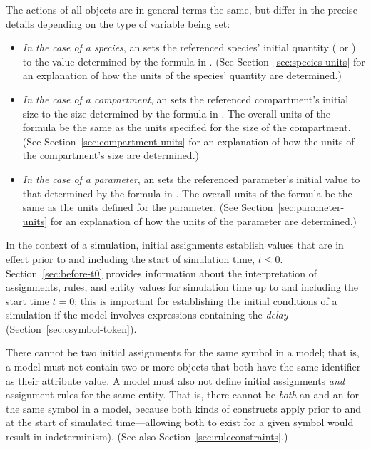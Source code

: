The actions of all \InitialAssignment objects are in general terms
the same, but differ in the precise details depending on the type
of variable being set:
\begin{itemize}

\item \emph{In the case of a species}, an \InitialAssignment sets
  the referenced species' initial quantity
  ( or ) to
  the value determined by the formula in .  (See
  Section~\ref{sec:species-units} for an explanation of how the
  units of the species' quantity are determined.)

\item \emph{In the case of a compartment}, an \InitialAssignment
  sets the referenced compartment's initial size to the size
  determined by the formula in .  The overall units of
  the formula  be the same as the units specified for the size of the
  compartment.  (See Section~\ref{sec:compartment-units} for an
  explanation of how the units of the compartment's size are
  determined.)

\item \emph{In the case of a parameter}, an \InitialAssignment
  sets the referenced parameter's initial value to that determined
  by the formula in .  The overall units of the
  formula  be the same as the units defined for the parameter.  (See
  Section~\ref{sec:parameter-units} for an explanation of how the
  units of the parameter are determined.)

\end{itemize}

In the context of a simulation, initial assignments establish
values that are in effect prior to and including the start of
simulation time, \ie $t \leq 0$.  Section~\ref{sec:before-t0}
provides information about the interpretation of assignments,
rules, and entity values for simulation time up to and including
the start time $t = 0$; this is important for establishing the
initial conditions of a simulation if the model involves
expressions containing the \emph{delay} 
(Section~\ref{sec:csymbol-token}).

There cannot be two initial assignments for the same symbol in a
model; that is, a model must not contain two or more
\InitialAssignment objects that both have the same identifier as
their  attribute value.  A model must also not define
initial assignments \emph{and} assignment rules for the same
entity.  That is, there cannot be \emph{both} an
\InitialAssignment and an \AssignmentRule for the same symbol in a
model, because both kinds of constructs apply prior to and at the
start of simulated time---allowing both to exist for a given
symbol would result in indeterminism).  (See also
Section~\ref{sec:ruleconstraints}.)

